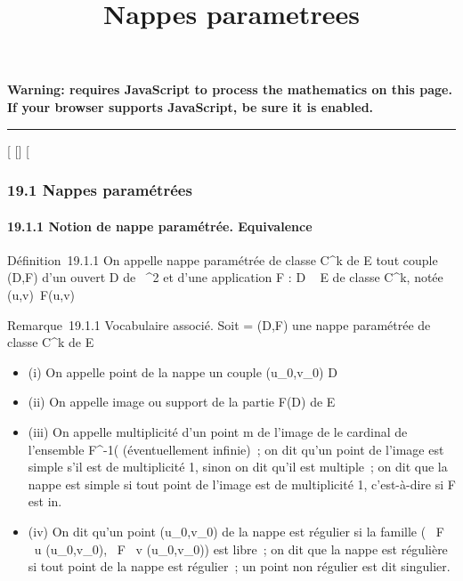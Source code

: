 \documentclass[]{article}
\title{Nappes parametrees}
\author{}
\date{}
\begin{document}
\maketitle

\textbf{Warning: 
requires JavaScript to process the mathematics on this page.\\ If your
browser supports JavaScript, be sure it is enabled.}

\begin{center}\rule{3in}{0.4pt}\end{center}

{[}
{[}{]}
{[}

\subsubsection{19.1 Nappes paramétrées}

\paragraph{19.1.1 Notion de nappe paramétrée. Equivalence}

Définition~19.1.1 On appelle nappe paramétrée de classe C^k
de E tout couple (D,F) d'un ouvert D de ~^2 et d'une
application F : D \rightarrow~ E de classe C^k, notée
(u,v)\mapsto~F(u,v)

Remarque~19.1.1 Vocabulaire associé. Soit \Sigma = (D,F) une nappe paramétrée
de classe C^k de E

\begin{itemize}
\itemsep1pt\parskip0pt
\item
  (i) On appelle point de la nappe \Sigma un couple
  (u\_0,v\_0) \in D
\item
  (ii) On appelle image ou support de \Sigma la partie F(D) de E
\item
  (iii) On appelle multiplicité d'un point m de l'image de \Sigma le cardinal
  de l'ensemble F^-1(\m\)
  (éventuellement infinie)~; on dit qu'un point de l'image est simple
  s'il est de multiplicité 1, sinon on dit qu'il est multiple~; on dit
  que la nappe est simple si tout point de l'image est de multiplicité
  1, c'est-à-dire si F est in\jmathective.
\item
  (iv) On dit qu'un point (u\_0,v\_0) de la nappe \Sigma est
  régulier si la famille ( \partial~F \over \partial~u
  (u\_0,v\_0), \partial~F \over \partial~v
  (u\_0,v\_0)) est libre~; on dit que la nappe est
  régulière si tout point de la nappe est régulier~; un point non
  régulier est dit singulier.
\end{itemize}
\end{document}
